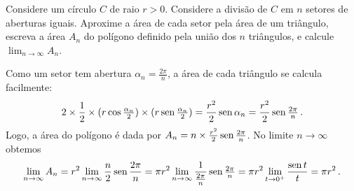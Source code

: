\begin{exo}\label{Exo:DecomporCircemTriang}
Considere um círculo $C$ de raio $r>0$. Considere a divisão de $C$ em $n$
setores de aberturas iguais. 
Aproxime a área de cada setor pela área de um triângulo,
escreva a área $A_n$ do polígono definido pela união dos $n$ triângulos, e
calcule $\lim_{n\to \infty}A_n$.
\begin{sol}\mbox{}
\begin{center}
\begin{bmlimage}\end{bmlimage}
\end{center}
Como um setor tem abertura $\alpha_n=\frac{2\pi}{n}$, 
a área de cada triângulo se calcula facilmente:
$$2\times \frac12
\times(r\cos\tfrac{\alpha_n}{2})\times
(r\operatorname{sen}\tfrac{\alpha_n}{2})=\frac{r^2}{2}\operatorname{sen}
{\alpha_n}=\frac{r^2}{2}\operatorname{sen} \tfrac{2\pi}{n}\,.$$
Logo, a área do polígono é dada por $A_n=n\times \frac{r^2}{2}\operatorname{sen}
\frac{2\pi}{n}$. No limite $n\to \infty$ obtemos
$$
\lim_{n\to \infty}A_n=r^2\lim_{n\to \infty}\frac{n}{2}\operatorname{sen} \frac{2\pi}{n}
=\pi r^2\lim_{n\to \infty}\frac{1}{\frac{2\pi}{n}}\operatorname{sen} \tfrac{2\pi}{n}
=\pi r^2\lim_{t\to 0^+}\frac{\operatorname{sen} t}{t}=\pi r^2\,.
$$
\end{sol}
\end{exo}

